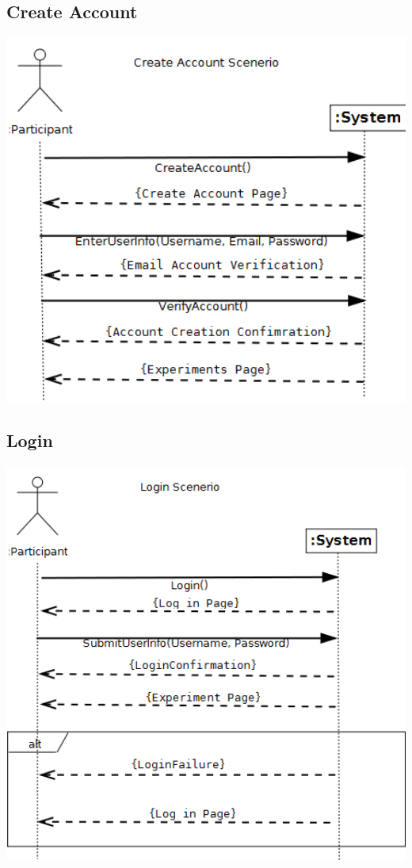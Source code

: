 \subsection{Create Account}
\includegraphics[width=6in]{../other/System-Sequence-diagrams/create-account.png}
\subsection{Login}
\includegraphics[width=6in]{../other/System-Sequence-diagrams/login.png}